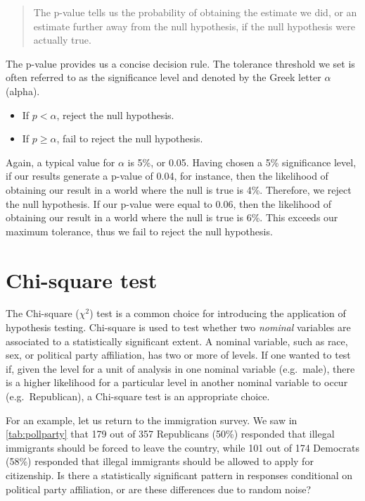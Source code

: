 \documentclass[
]{book}
\providecommand{\tightlist}{%
  \setlength{\itemsep}{0pt}\setlength{\parskip}{0pt}}
\begin{document}
\begin{quote}
The p-value tells us the probability of obtaining the estimate we did, or an estimate further away from the null hypothesis, if the null hypothesis were actually true.
\end{quote}

The p-value provides us a concise decision rule. The tolerance threshold we set is often referred to as the significance level and denoted by the Greek letter \(\alpha\) (alpha).

\begin{itemize}
\tightlist
\item
  If \(p<\alpha\), reject the null hypothesis.
\item
  If \(p\geq \alpha\), fail to reject the null hypothesis.
\end{itemize}

Again, a typical value for \(\alpha\) is 5\%, or 0.05. Having chosen a 5\% significance level, if our results generate a p-value of 0.04, for instance, then the likelihood of obtaining our result in a world where the null is true is 4\%. Therefore, we reject the null hypothesis. If our p-value were equal to 0.06, then the likelihood of obtaining our result in a world where the null is true is 6\%. This exceeds our maximum tolerance, thus we fail to reject the null hypothesis.

\hypertarget{chi-square-test}{%
\section{Chi-square test}\label{chi-square-test}}

The Chi-square (\(\chi^2\)) test is a common choice for introducing the application of hypothesis testing. Chi-square is used to test whether two \emph{nominal} variables are associated to a statistically significant extent. A nominal variable, such as race, sex, or political party affiliation, has two or more of levels. If one wanted to test if, given the level for a unit of analysis in one nominal variable (e.g.~male), there is a higher likelihood for a particular level in another nominal variable to occur (e.g.~Republican), a Chi-square test is an appropriate choice.

For an example, let us return to the immigration survey. We saw in \ref{tab:pollparty} that 179 out of 357 Republicans (50\%) responded that illegal immigrants should be forced to leave the country, while 101 out of 174 Democrats (58\%) responded that illegal immigrants should be allowed to apply for citizenship. Is there a statistically significant pattern in responses conditional on political party affiliation, or are these differences due to random noise?
\end{document}
